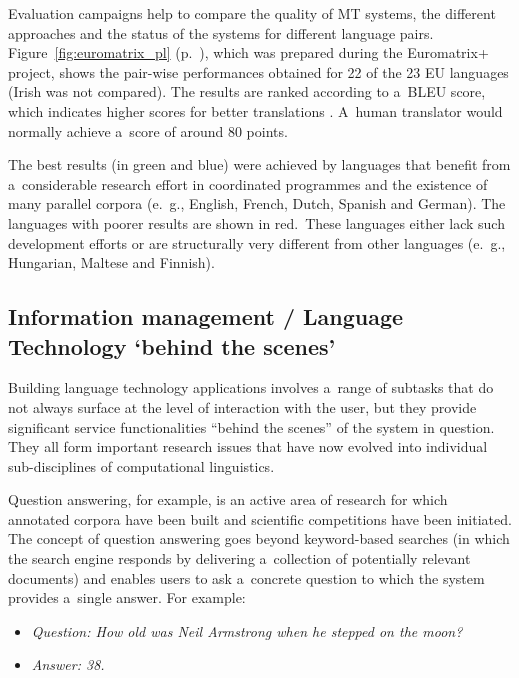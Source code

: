 \begin{multicols}{2}
Evaluation campaigns help to compare the quality of MT systems, the
different approaches and the status of the systems for different
language pairs. Figure~\ref{fig:euromatrix_pl} (p.~\pageref{fig:euromatrix_pl}), which was prepared during the Euromatrix+ project,
shows the pair-wise performances obtained for 22 of the 23 EU
languages (Irish was not compared). The results are ranked according
to a~BLEU score, which indicates higher scores for better translations
\cite{bleu1}. A~human translator would normally achieve a~score of
around 80 points. 

The best results (in green and blue) were achieved by languages that
benefit from a~considerable research effort in coordinated programmes
and the existence of many parallel corpora (e.\, g., English, French,
Dutch, Spanish and German). The languages with poorer results are
shown in red.~These languages either lack such development efforts or
are structurally very different from other languages (e.\, g.,
Hungarian, Maltese and Finnish). 
\vfill
\columnbreak

\subsection{Information management / Language Technology ‘behind the
scenes’} 

Building language technology applications involves a~range of subtasks
that do not always surface at the level of interaction with the user,
but they provide significant service functionalities “behind the
scenes” of the system in question. They all form important research
issues that have now evolved into individual sub-disciplines of
computational linguistics. 

Question answering, for example, is an active area of research for
which annotated corpora have been built and scientific competitions
have been initiated. The concept of question answering goes beyond
keyword-based searches (in which the search engine responds by
delivering a~collection of potentially relevant documents) and enables
users to ask a~concrete question to which the system provides a~single
answer. For example: 

\begin{itemize} 
  \item[] \textit{Question: How old was Neil Armstrong
when he stepped on the moon?} 
  \item[] \textit{Answer: 38.}
\end{itemize} 


\end{multicols}
